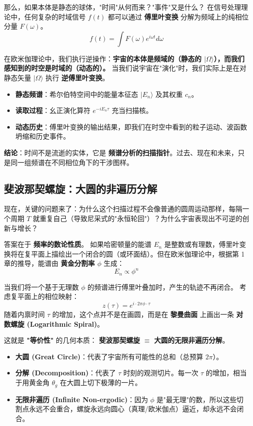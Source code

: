 那么，如果本体是静态的球体，"时间"从何而来？"事件"又是什么？
在信号处理理论中，任何复杂的时域信号 $f(t)$ 都可以通过 \textbf{傅里叶变换} 分解为频域上的纯相位分量 $F(\omega)$。
\[f(t) = \int F(\omega) e^{i\omega t} d\omega\]

在欧米伽理论中，我们执行逆操作：\textbf{宇宙的本体是频域的（静态的 $|\Omega\rangle$），而我们感知到的时空是时域的（动态的）。}
当我们说宇宙在"演化"时，我们实际上是在对静态矢量 $|\Omega\rangle$ 执行 \textbf{逆傅里叶变换}。

\begin{itemize}
\item \textbf{静态频谱}：希尔伯特空间中的能量本征态 $|E_n\rangle$ 及其权重 $c_n$。
\item \textbf{读取过程}：幺正演化算符 $e^{-i E_n \tau}$ 充当扫描核。
\item \textbf{动态历史}：傅里叶变换的输出结果，即我们在时空中看到的粒子运动、波函数坍缩和历史事件。
\end{itemize}

\textbf{结论}：时间不是流逝的实体，它是 \textbf{频谱分析的扫描指针}。过去、现在和未来，只是同一组频谱在不同相位角下的干涉图样。

\subsection{斐波那契螺旋：大圆的非遍历分解}

现在，关键的问题来了：为什么这个扫描过程不会像普通的圆周运动那样，每隔一个周期 $T$ 就重复自己（导致尼采式的"永恒轮回"）？为什么宇宙表现出不可逆的创新与增长？

答案在于 \textbf{频率的数论性质}。
如果哈密顿量的能谱 $E_n$ 是整数或有理数，傅里叶变换将在复平面上描绘出一个闭合的圆（或环面结）。但在欧米伽理论中，根据第 1 章的推导，能谱由 \textbf{黄金分割率 $\phi$} 生成：
\[E_n \propto \phi^n\]

当我们将一个基于无理数 $\phi$ 的频谱进行傅里叶叠加时，产生的轨迹不再闭合。
考虑复平面上的相位映射：
\[z(\tau) = e^{i \cdot 2\pi \phi \cdot \tau}\]
随着内禀时间 $\tau$ 的增加，这个点并不是在画圆，而是在 \textbf{黎曼曲面} 上画出一条 \textbf{对数螺旋 (Logarithmic Spiral)}。

这就是 \textbf{"等价性"} 的几何本质：
\textbf{斐波那契螺旋 $\equiv$ 大圆的无限非遍历分解}。

\begin{itemize}
\item \textbf{大圆 (Great Circle)}：代表了宇宙所有可能性的总和（总预算 $2\pi$）。
\item \textbf{分解 (Decomposition)}：代表了 $\tau$ 时刻的观测切片。每一次 $\tau$ 的增加，相当于用黄金角 $\theta_g$ 在大圆上切下极薄的一片。
\item \textbf{无限非遍历 (Infinite Non-ergodic)}：因为 $\phi$ 是"最无理"的数，所以这些切割点永远不会重合，螺旋永远向圆心（真理/欧米伽点）逼近，却永远不会闭合。
\end{itemize}

